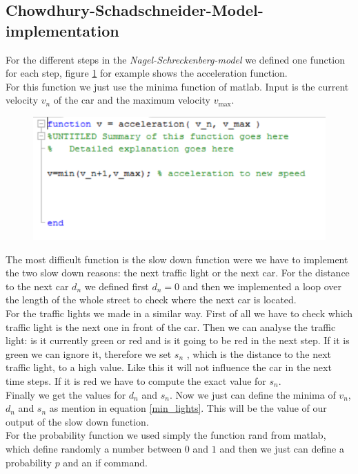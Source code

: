 \documentclass[11pt]{article}
\begin{document}
\subsection{Chowdhury-Schadschneider-Model-implementation}
For the different steps in the \textit{Nagel-Schreckenberg-model} we defined one function for each step, figure \ref{accel} for example shows the acceleration function.\\
For this function we just use the minima function of matlab. Input is the current velocity $v_n$ of the car and the maximum velocity $v_\mathrm{max}$.
\begin{figure}[h]
	\centering
\includegraphics[width=\textwidth]{accel-code.png}
\label{accel}
\end{figure}
The most difficult function is the slow down function were we have to implement the two slow down reasons: the next traffic light or the next car. For the distance to the next car $d_n$ we defined first $d_n=0$ and then we implemented a loop over the length of the whole street to check where the next car is located.\\
For the traffic lights we made in a similar way. First of all we have to check which traffic light is the next one in front of the car. Then we can analyse the traffic light: is it currently green or red and is it going to be red in the next step. If it is green we can ignore it, therefore we set $s_n$ , which is the distance to the next traffic light, to a high value. Like this it will not influence the car in the next time steps. If it is red we have to compute the exact value for $s_n$.\\
Finally we get the values for $d_n$ and $s_n$. Now we just can define the minima of $v_n$, $d_n$ and $s_n$ as mention in equation \ref{min_lights}. This will be the value of our output of the slow down function.\\
For the probability function we used simply the function rand from matlab, which define randomly a number between $0$ and $1$ and then we just can define a probability $p$ and an if command.\\
\end{document}
